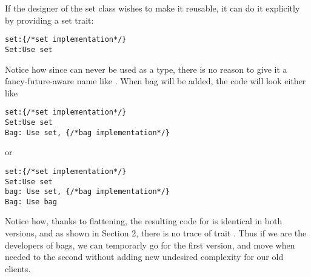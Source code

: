 If the designer of the set class wishes to make it reusable, it can do it explicitly by providing a set trait:
\begin{lstlisting}
set:{/*set implementation*/} 
Set:Use set
\end{lstlisting}
Notice how since \Q@set@ can never be used as a type, there is no reason to give it a fancy-future-aware name like
\Q@AbstractSetOrBag@.
When bag will be added, the code will look either like
\begin{lstlisting}
set:{/*set implementation*/} 
Set:Use set
Bag: Use set, {/*bag implementation*/}
\end{lstlisting}
or 
\begin{lstlisting}
set:{/*set implementation*/} 
Set:Use set
bag: Use set, {/*bag implementation*/}
Bag: Use bag
\end{lstlisting}
Notice how, thanks to flattening, the resulting code for \Q@Bag@ is identical in both versions, 
and as shown in Section 2, there is no trace of trait \Q@bag@. Thus if we are the developers of bags, we can temporarly go for the first version, and move when needed to the second without adding new undesired complexity for our old clients. 



